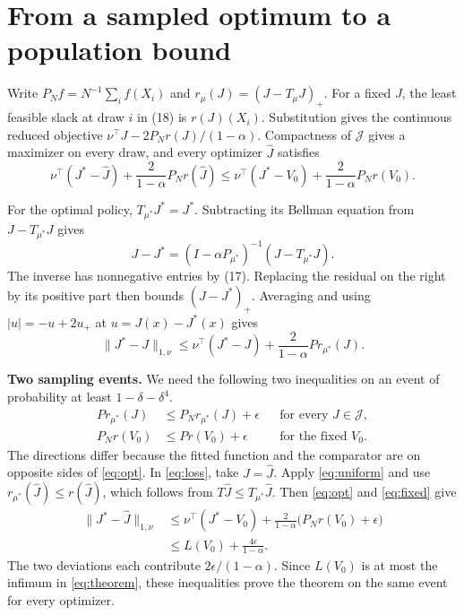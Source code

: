 \documentclass[12pt,a4paper]{article}
\newcommand{\lead}[1]{\par\smallskip\noindent\textbf{#1}\enspace}
\newcommand{\class}{\mathcal J}
\begin{document}
\newpage
\section*{From a sampled optimum to a population bound}
Write \(P_N f=N^{-1}\sum_i f(X_i)\) and \(r_\mu(J)=(J-T_\mu J)_+\).
For a fixed \(J\), the least feasible slack at draw \(i\) in (18) is
\(r(J)(X_i)\). Substitution gives the continuous reduced objective
\(\nu^\top J-2P_Nr(J)/(1-\alpha)\). Compactness of \(\class\) gives
a maximizer on every draw, and every optimizer \(\widehat J\) satisfies
\begin{equation}
 \nu^\top(J^*-\widehat J)+\frac{2}{1-\alpha}P_Nr(\widehat J)
 \le \nu^\top(J^*-V_0)+\frac{2}{1-\alpha}P_Nr(V_0).
 \tag{a}\label{eq:opt}
\end{equation}

For the optimal policy, \(T_{\mu^*}J^*=J^*\). Subtracting its Bellman
equation from \(J-T_{\mu^*}J\) gives
\[
 J-J^*=(I-\alpha P_{\mu^*})^{-1}(J-T_{\mu^*}J).
\]
The inverse has nonnegative entries by (17). Replacing the residual on
the right by its positive part then bounds \((J-J^*)_+\). Averaging and
using \(|u|=-u+2u_+\) at \(u=J(x)-J^*(x)\) gives
\begin{equation}
 \|J^*-J\|_{1,\nu}
 \le\nu^\top(J^*-J)+\frac{2}{1-\alpha}P r_{\mu^*}(J).
 \tag{b}\label{eq:loss}
\end{equation}

\lead{Two sampling events.}
We need the following two inequalities on an event of probability at
least \(1-\delta-\delta^4\).
\begin{align}
 P r_{\mu^*}(J)&\le P_N r_{\mu^*}(J)+\epsilon
           &&\text{for every }J\in\class, \tag{c}\label{eq:uniform}\\
 P_Nr(V_0)&\le P r(V_0)+\epsilon
           &&\text{for the fixed }V_0. \tag{d}\label{eq:fixed}
\end{align}
The directions differ because the fitted function and the comparator are on
opposite sides of \eqref{eq:opt}. In \eqref{eq:loss}, take \(J=\widehat J\).
Apply \eqref{eq:uniform} and use \(r_{\mu^*}(\widehat J)\le r(\widehat J)\),
which follows from \(T\widehat J\le T_{\mu^*}\widehat J\).
Then \eqref{eq:opt} and \eqref{eq:fixed} give
\begin{align*}
 \|J^*-\widehat J\|_{1,\nu}
 &\le \nu^\top(J^*-V_0)+\frac{2}{1-\alpha}\bigl(P_Nr(V_0)+\epsilon\bigr)\\
 &\le L(V_0)+\frac{4\epsilon}{1-\alpha}.
\end{align*}
The two deviations each contribute \(2\epsilon/(1-\alpha)\).
Since \(L(V_0)\) is at most the infimum in \eqref{eq:theorem}, these
inequalities prove the theorem on the same event for every optimizer.
\end{document}
